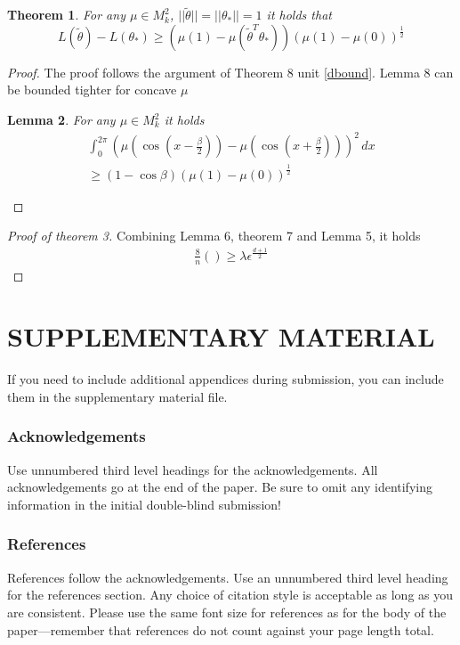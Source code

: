 \documentclass[twoside]{article} \usepackage{aistats2017}
\newtheorem{theorem}{Theorem}
\newtheorem{lemma}[theorem]{Lemma}
\begin{document}
\begin{theorem}
For any $\mu \in M_k^2$, $||\tilde{\theta}||=||\theta_*||=1$ it holds that
$$L(\tilde{\theta})-L(\theta_*) \geq (\mu(1)-\mu(\tilde{\theta}^T\theta_*) )(\mu(1)-\mu(0))^{\frac{1}{2}}$$
\end{theorem}
\begin{proof}
The proof follows the argument of Theorem 8 unit \ref{dbound}. Lemma 8 can be bounded tighter for concave $\mu$
\begin{lemma}
    For any $\mu\in M_k^2$ it holds
\begin{align*}
            \int_{0}^{2\pi}\left(\mu(\cos(x-\frac{\beta}{2}))-\mu( \cos(x+\frac{\beta}{2}))\right)^2\, dx\\
            \geq (1-\cos{\beta})(\mu(1)-\mu(0))^\frac{1}{2}
\end{align*}
\end{lemma}
\end{proof}
\begin{proof}[Proof of theorem 3]
 Combining Lemma 6, theorem 7 and Lemma 5, it holds
 \begin{align*}
     \frac{8}{n}() \geq \lambda \epsilon^{\frac{d+1}{2}}
 \end{align*}
\end{proof}
\section{SUPPLEMENTARY MATERIAL}

If you need to include additional appendices during submission, you
can include them in the supplementary material file.


\newpage



\subsubsection*{Acknowledgements}

Use unnumbered third level headings for the acknowledgements.  All
acknowledgements go at the end of the paper.  Be sure to omit any
identifying information in the initial double-blind submission!


\subsubsection*{References}

References follow the acknowledgements.  Use an unnumbered third level
heading for the references section.  Any choice of citation style is
acceptable as long as you are consistent.  Please use the same font
size for references as for the body of the paper---remember that
references do not count against your page length total.
\end{document}
